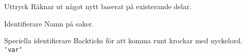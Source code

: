 \begin{Slide}{Uttryck}
Räknar ut något nytt baserat på existerande delar.
\end{Slide}

\begin{Slide}{Identifierare}
Namn på saker.
\end{Slide}


\begin{Slide}{Speciella identifierare}
Backticks för att komma runt krockar med nyckelord. \texttt{`var`}
\end{Slide}





\ifkompendium\else
{} 
\fi